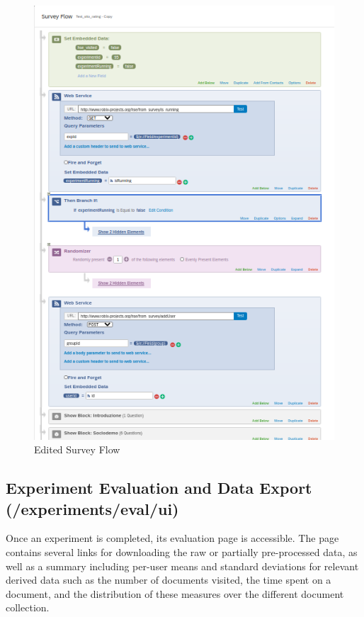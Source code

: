 \documentclass[fleqn]{article}
\begin{document}
\begin{figure} [h]
\centering
\includegraphics[width=.9\textwidth]{img/qflow}
\caption{Edited Survey Flow}
\label{fig:qflow}
\end{figure}

\newpage


\subsection{Experiment Evaluation and Data Export \small{(/experiments/eval/ui)}}

Once an experiment is completed, its evaluation page is accessible. The page contains several links for downloading the raw or
partially pre-processed data, as well as a summary including per-user means and standard deviations for relevant derived data such as
the number of documents visited, the time spent on a document, and the distribution of these measures over the different
document collection.
\end{document}
